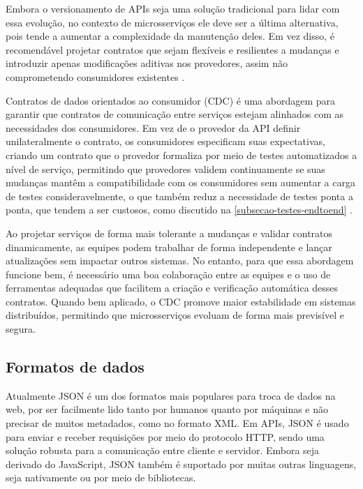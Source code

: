 Embora o versionamento de APIs seja uma solução tradicional para lidar com essa evolução, no contexto de microsserviços ele deve ser a última alternativa, pois tende a aumentar a complexidade da manutenção deles. Em vez disso, é recomendável projetar contratos que sejam flexíveis e resilientes a mudanças e introduzir apenas modificações aditivas nos provedores, assim não comprometendo consumidores existentes \cite{martin-fowler-microservices}.

Contratos de dados orientados ao consumidor (CDC) é uma abordagem para garantir que contratos de comunicação entre serviços estejam alinhados com as necessidades dos consumidores. Em vez de o provedor da API definir unilateralmente o contrato, os consumidores especificam suas expectativas, criando um contrato que o provedor formaliza por meio de testes automatizados a nível de serviço, permitindo que provedores validem continuamente se suas mudanças mantêm a compatibilidade com os consumidores sem aumentar a carga de testes consideravelmente, o que também reduz a necessidade de testes ponta a ponta, que tendem a ser custosos, como discutido na \autoref{subsecao-testes-endtoend} \cite{consumer-driven-contracts,livro-building-microservices}.

Ao projetar serviços de forma mais tolerante a mudanças e validar contratos dinamicamente, as equipes podem trabalhar de forma independente e lançar atualizações sem impactar outros sistemas. No entanto, para que essa abordagem funcione bem, é necessário uma boa colaboração entre as equipes e o uso de ferramentas adequadas que facilitem a criação e verificação automática desses contratos. Quando bem aplicado, o CDC promove maior estabilidade em sistemas distribuídos, permitindo que microsserviços evoluam de forma mais previsível e segura. \cite{consumer-driven-contracts}

\subsection{Formatos de dados}\label{subsecao-trocas-de-dados}
Atualmente JSON é um dos formatos mais populares para troca de dados na web, por ser facilmente lido tanto por humanos quanto por máquinas e não precisar de muitos metadados, como no formato XML. Em APIs, JSON é usado para enviar e receber requisições por meio do protocolo HTTP, sendo uma solução robusta para a comunicação entre cliente e servidor. Embora seja derivado do JavaScript, JSON também é suportado por muitas outras linguagens, seja nativamente ou por meio de bibliotecas. \cite{json_bourhis_2020}

